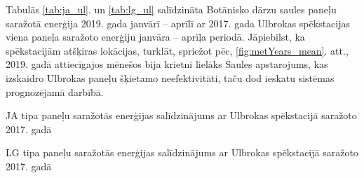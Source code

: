 Tabulās \ref{tab:ja_ul}. un \ref{tab:lg_ul} salīdzināta Botānisko dārzu saules paneļu saražotā enerģija 2019. gada janvārī -- aprīlī ar 2017. gada Ulbrokas spēkstacijas viena paneļa saražoto enerģiju janvāra -- aprīļa periodā. Jāpiebilst, ka spēkstacijām atšķiras lokācijas, turklāt, spriežot pēc, \ref{fig:metYears_mean}. att., 2019. gadā attiecīgajos mēnešos bija krietni lielāks Saules apstarojums, kas izskaidro Ulbrokas paneļu šķietamo neefektivitāti, taču dod ieskatu sistēmas prognozējamā darbībā.
\begin{table}[h]
    \caption{JA tipa paneļu saražotās enerģijas salīdzinājums ar Ulbrokas spēkstacijā saražoto 2017. gadā}
    \begin{center}
    
    \end{center} \label{tab:ja_ul}
\end{table}
\begin{table}[h]
    \caption{LG tipa paneļu saražotās enerģijas salīdzinājums ar Ulbrokas spēkstacijā saražoto 2017. gadā}
    \begin{center}
    
    \end{center}\label{tab:lg_ul}
\end{table}